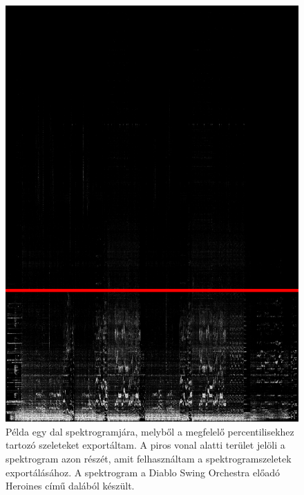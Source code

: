 \begin{figure}[p]
    \centering
    \includegraphics[height=0.75\paperheight]{src/images/DSO_Heroines.png}
    \caption{Példa egy dal spektrogramjára, melyből a megfelelő percentilisekhez tartozó szeleteket exportáltam. A piros
    vonal alatti terület jelöli a spektrogram azon részét, amit felhasználtam a spektrogramszeletek exportálásához. A spektrogram
    a Diablo Swing Orchestra előadó Heroines című dalából készült.}
\end{figure}

